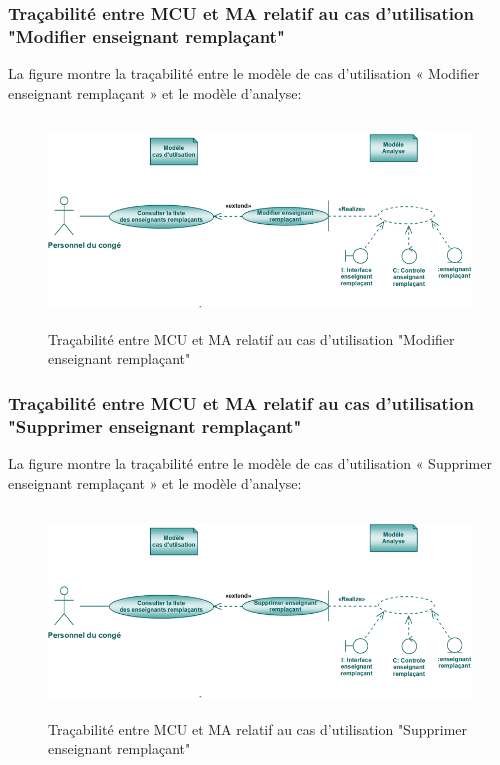 \documentclass[12 pt ]{report}
\begin{document}
\subsubsection{Traçabilité entre MCU et MA relatif au  cas d’utilisation "Modifier enseignant remplaçant" }
La figure  montre la traçabilité entre le modèle de  cas d’utilisation « Modifier enseignant remplaçant » et le modèle d’analyse:
\begin{figure}[h]
\begin{center}
\includegraphics[width= 12cm , height =5.5cm]{mod_rem.PNG}
\caption{Traçabilité entre MCU et MA relatif au  cas d’utilisation "Modifier enseignant remplaçant"}
\end{center}
\end{figure}
\subsubsection{Traçabilité entre MCU et MA relatif au  cas d’utilisation "Supprimer enseignant remplaçant" }
La figure  montre la traçabilité entre le modèle de  cas d’utilisation « Supprimer enseignant remplaçant » et le modèle d’analyse:
\begin{figure}[h]
\begin{center}
\includegraphics[width= 12cm , height =5.5cm]{sup_rem.PNG}
\caption{Traçabilité entre MCU et MA relatif au  cas d’utilisation "Supprimer enseignant remplaçant"}
\end{center}
\end{figure}
\end{document}
